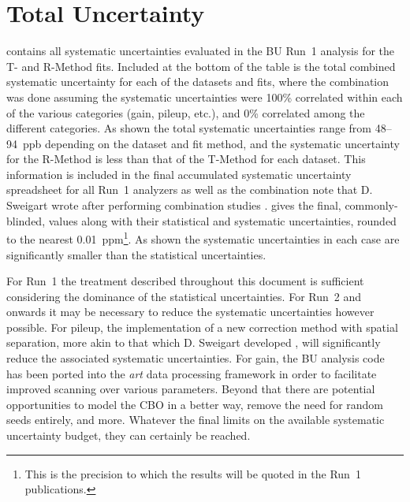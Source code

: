 
\section{Total Uncertainty}


 contains all systematic uncertainties evaluated in the BU Run~1 \wa analysis for the T- and R-Method fits. Included at the bottom of the table is the total combined systematic uncertainty for each of the datasets and fits, where the combination was done assuming the systematic uncertainties were 100\% correlated within each of the various categories (gain, pileup, etc.), and 0\% correlated among the different categories. As shown the total systematic uncertainties range from 48--94~ppb depending on the dataset and fit method, and the systematic uncertainty for the R-Method is less than that of the T-Method for each dataset. This information is included in the final accumulated systematic uncertainty spreadsheet for all Run~1 analyzers \cite{UncertaintySpreadsheet} as well as the combination note that D. Sweigart wrote after performing combination studies \cite{CombinationNote}.  gives the final, commonly-blinded, \R values along with their statistical and systematic uncertainties, rounded to the nearest 0.01~ppm\footnote{This is the precision to which the results will be quoted in the Run~1 publications.}. As shown the systematic uncertainties in each case are significantly smaller than the statistical uncertainties.


For Run~1 the treatment described throughout this document is sufficient considering the dominance of the statistical uncertainties. For Run~2 and onwards it may be necessary to reduce the systematic uncertainties however possible. For pileup, the implementation of a new correction method with spatial separation, more akin to that which D. Sweigart developed \cite{phdthesis:2020Sweigart}, will significantly reduce the associated systematic uncertainties. For gain, the BU analysis code has been ported into the \textit{art} data processing framework in order to facilitate improved scanning over various parameters. Beyond that there are potential opportunities to model the CBO in a better way, remove the need for random seeds entirely, and more. Whatever the final limits on the available systematic uncertainty budget, they can certainly be reached.



